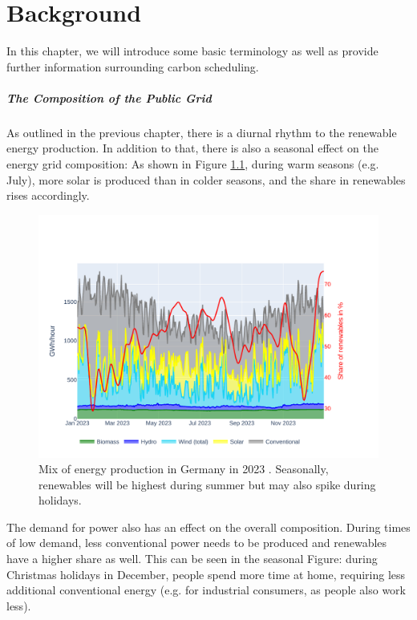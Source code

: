 \chapter{Background}
\label{chap:backgroud}

In this chapter, we will introduce some basic terminology as well as provide further information surrounding carbon scheduling.

\paragraph{The Composition of the Public Grid}

As outlined in the previous chapter, there is a diurnal rhythm to the renewable energy production.
In addition to that, there is also a seasonal effect on the energy grid composition:
As shown in Figure \ref{fig:energy_mix_year}, during warm seasons (e.g. July), more solar is produced than in colder seasons, and the share in renewables rises accordingly.

\begin{figure}
    \includegraphics[width=\linewidth]{agorameter/energy_production_year.pdf}
    \caption[short]{Mix of energy production in Germany in 2023 . Seasonally, renewables will be highest during summer but may also spike during holidays.}
    \label{fig:energy_mix_year}
\end{figure}

The demand for power also has an effect on the overall composition. 
During times of low demand, less conventional power needs to be produced and renewables have a higher share as well.
This can be seen in the seasonal Figure: during Christmas holidays in December, people spend more time at home, requiring less additional conventional energy (e.g. for industrial consumers, as people also work less).

